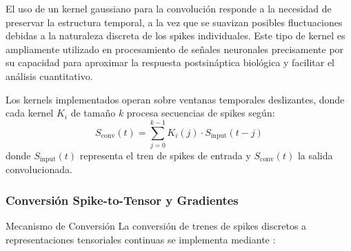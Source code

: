 El uso de un kernel gaussiano para la convolución responde a la necesidad de preservar la estructura temporal, a la vez que se suavizan posibles fluctuaciones debidas a la naturaleza discreta de los spikes individuales. Este tipo de kernel es ampliamente utilizado en procesamiento de señales neuronales precisamente por su capacidad para aproximar la respuesta postsináptica biológica y facilitar el análisis cuantitativo.

Los kernels implementados operan sobre ventanas temporales deslizantes, donde cada kernel \( K_i \) de tamaño \( k \) procesa secuencias de spikes según:
\begin{equation}
    S_{\text{conv}}(t) = \sum_{j=0}^{k-1} K_i(j) \cdot S_{\text{input}}(t-j)
\end{equation}
donde \( S_{\text{input}}(t) \) representa el tren de spikes de entrada y \( S_{\text{conv}}(t) \) la salida convolucionada.






\subsubsection {Conversión Spike-to-Tensor y Gradientes}
Mecanismo de Conversión
La conversión de trenes de spikes discretos a representaciones tensoriales continuas se implementa mediante :

